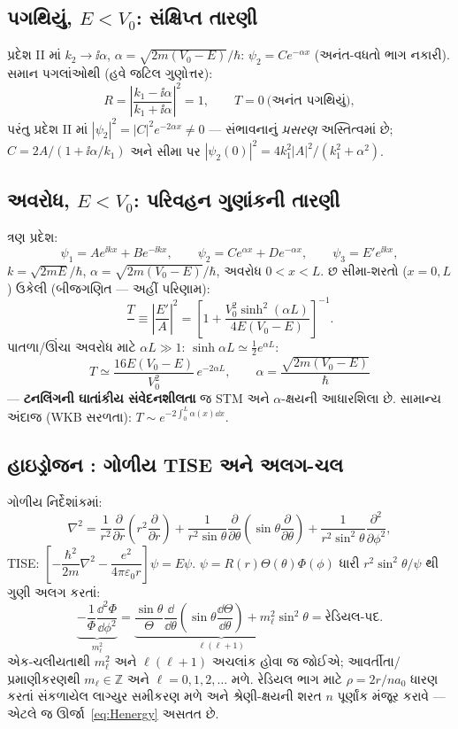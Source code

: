 \subsection{પગથિયું, $E<V_0$: સંક્ષિપ્ત તારણી}
પ્રદેશ II માં $k_2\to\ii\alpha$, $\alpha=\sqrt{2m(V_0-E)}/\hbar$: $\psi_2=Ce^{-\alpha x}$ (અનંત-વધતો ભાગ નકારી).
સમાન પગલાંઓથી (હવે જટિલ ગુણોત્તર):
\begin{equation}
R=\left|\frac{k_1-\ii\alpha}{k_1+\ii\alpha}\right|^{2}=1,
\qquad
T=0\ \text{(અનંત પગથિયું)},
\end{equation}
પરંતુ પ્રદેશ II માં $|\psi_2|^2=|C|^2e^{-2\alpha x}\neq0$ — સંભાવનાનું \emph{પ્રસરણ} અસ્તિત્વમાં છે; $C=2A/(1+\ii\alpha/k_1)$ અને સીમા પર $|\psi_2(0)|^{2}=4k_1^{2}|A|^{2}/(k_1^{2}+\alpha^{2})$.

\subsection{અવરોધ, $E<V_0$: પરિવહન ગુણાંકની તારણી}
ત્રણ પ્રદેશ:
\[
\psi_1=Ae^{\ii kx}+Be^{-\ii kx},\qquad
\psi_2=Ce^{\alpha x}+De^{-\alpha x},\qquad
\psi_3=E'e^{\ii kx},
\]
$k=\sqrt{2mE}/\hbar$, $\alpha=\sqrt{2m(V_0-E)}/\hbar$, અવરોધ $0<x<L$.
છ સીમા-શરતો ($x=0,L$) ઉકેલી (બીજગણિત — અહીં પરિણામ):
\[
\frac{T}{ }\equiv\left|\frac{E'}{A}\right|^{2}
=\left[1+\frac{V_0^{2}\sinh^{2}(\alpha L)}{4E(V_0-E)}\right]^{-1}.
\]
પાતળા/ઊંચા અવરોધ માટે $\alpha L\gg1$: $\sinh\alpha L\simeq\tfrac12e^{\alpha L}$:
\begin{equation}
\boxed{\;T\simeq\frac{16E(V_0-E)}{V_0^{2}}\,e^{-2\alpha L},\qquad
\alpha=\frac{\sqrt{2m(V_0-E)}}{\hbar}\;}
\label{eq:tunnelT}
\end{equation}
— \textbf{ટનલિંગની ઘાતાંકીય સંવેદનશીલતા} જ STM અને $\alpha$-ક્ષયની આધારશિલા છે. સામાન્ય અંદાજ (WKB સરળતા): $T\sim e^{-2\int_0^{L}\alpha(x)\dd x}$.

\subsection{હાઇડ્રોજન : ગોળીય TISE અને અલગ-ચલ}
ગોળીય નિર્દેશાંકમાં:
\[
\nabla^{2}=\frac{1}{r^{2}}\frac{\partial}{\partial r}\!\left(r^{2}\frac{\partial}{\partial r}\right)
+\frac{1}{r^{2}\sin\theta}\frac{\partial}{\partial\theta}\!\left(\sin\theta\frac{\partial}{\partial\theta}\right)
+\frac{1}{r^{2}\sin^{2}\theta}\frac{\partial^{2}}{\partial\phi^{2}},
\]
TISE: $\left[-\dfrac{\hbar^{2}}{2m}\nabla^{2}-\dfrac{e^{2}}{4\pi\varepsilon_0 r}\right]\psi=E\psi$.
$\psi=R(r)\Theta(\theta)\Phi(\phi)$ ધારી $r^{2}\sin^{2}\theta/\psi$ થી ગુણી અલગ કરતાં:
\[
\underbrace{-\frac{1}{\Phi}\frac{\dd^{2}\Phi}{\dd\phi^{2}}}_{m_\ell^{2}}
=
\underbrace{\frac{\sin\theta}{\Theta}\frac{\dd}{\dd\theta}\!\left(\sin\theta\frac{\dd\Theta}{\dd\theta}\right)+m_\ell^{2}\sin^{2}\theta}_{\ell(\ell+1)}
=\text{રેડિયલ-પદ} .
\]
એક-ચલીયતાથી $m_\ell^{2}$ અને $\ell(\ell+1)$ અચલાંક હોવા જ જોઈએ; આવર્તીતા/પ્રમાણીકરણથી $m_\ell\in\mathbb Z$ અને $\ell=0,1,2,\dots$ મળે. રેડિયલ ભાગ માટે $\rho=2r/na_0$ ધારણ કરતાં સંકળાયેલ લાગ્યુર સમીકરણ મળે અને શ્રેણી-ક્ષયની શરત $n$ પૂર્ણાંક મંજૂર કરાવે — એટલે જ ઊર્જા~\eqref{eq:Henergy} અસતત છે.

